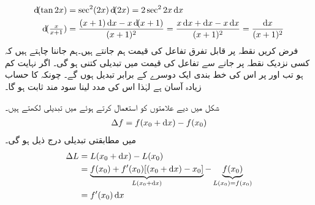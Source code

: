 \begin{align*}
\dif(\tan 2x)&=\sec^2(2x)\dif (2x)=2\sec^2 2x\dif x\\
\dif(\tfrac{x}{x+1})&=\frac{(x+1)\dif x-x\dif(x+1)}{(x+1)^2}=\frac{x\dif x+\dif x-x\dif x}{(x+1)^2}=\frac{\dif x}{(x+1)^2}
\end{align*}
فرض کریں نقطہ  پر قابل تفرق تفاعل  کی قیمت ہم جانتے ہیں۔ہم جاننا چاہتے ہیں کہ کسی نزدیک نقطہ  پر جانے سے تفاعل کی قیمت میں تبدیلی کتنی ہو گی۔ اگر  نہایت کم ہو تب  اور  پر اس کی خط بندی  ایک دوسرے کے برابر  تبدیل ہوں گے۔ چونکہ  کا حساب زیادہ آسان ہے لہٰذا اس کی مدد لینا سود مند ثابت ہو گا۔

شکل  میں دیے علامتوں کو استعمال کرتے ہوئے  میں تبدیلی لکھتے ہیں۔
\begin{align*}
\Delta f=f(x_0+\dif x)-f(x_0)
\end{align*}
 میں مطابقتی تبدیلی درج ذیل ہو گی۔
\begin{align*}
\Delta L&=L(x_0+\dif x)-L(x_0)\\
&=\underbrace{f(x_0)+f'(x_0)[(x_0+\dif x)-x_0]}_{L(x_0+\dif x)}-\underbrace{f(x_0)}_{L(x_0)=f(x_0)}\\
&=f'(x_0)\dif x
\end{align*}

